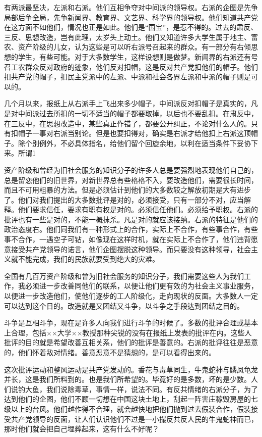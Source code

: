 有两派最坚决，左派和右派。他们互相争夺对中间派的领导权。右派的企图是先争局部后争全局，先争新闻界、教育界、文艺界、科学界的领导权。他们知道共产党在这方面不如他们，情况也正是如此。他们是“国宝”，是惹不得的。过去的肃反、三反、思想改造，岂有此理，太岁头上动土。他们又知道许多大学生属于地主、富农、资产阶级的儿女，认为这些是可以听右派号召起来的群众。有一部分有右倾思想的学生，有些可能。对于大多数学生，这样设想则是做梦。新闻界的右派还有号召工农群众反对政府的迹象，他们反对扣帽，这是反对共产党扣他们的帽子。他们扣共产党的帽子，扣民主党派中的左派、中派和社会各界左派和中派的帽子则是可以的。

几个月以来，报纸上从右派手上飞出来多少帽子，中间派反对扣帽子是真实的，凡是对中间派过去所扣的一切不适当的帽子都要取掉，以后也不要乱扣。在肃反中，在三反中，在思想改造中，某些真正作错了，都要公开纠正，不论对什么人的。只有扣帽子一事对右派当别论。但是也要扣得对，确实是右派才给他扣上右派这顶帽子。除个别例外，不必具体指名，给他们留个回旋余地，以利在适当条件下妥协下来。所谓1%

资产阶级和曾经为旧社会服务的知识分子的许多人总是要强烈地表现他们自己的，总是留恋他们的旧世界，对新世界总有些格格不入，要改造他们，需要很长时间，而且不可用粗暴的方法。但是必须估计到他们的大多数较之解放初期是大有进步了。他们对我们提出的大多数批评是对的，必须接受，只有一部分不对，应当解释。他们要求信任，要求有职有权是对的。必须信任他们。必须给予职权。右派的批评也有一些是对的，不能一概抹杀。凡是对的就应该接纳。右派的特征是他们的政治态度右。他们同我们有一种形式上的合作，实际上不合作，有些事合作，有些事不合作，一遇空子可钻，如像现在这样时机，就在实际上不合作了，他们违背愿意接受共产党领导的诺言，他们企图摆脱这种领导。而只要没有这种领导，社会主义就不能完成，我们的民族就要受到绝大的灾难。

全国有几百万资产阶级和曾为旧社会服务的知识分子，我们需要这些人为我们工作，我必须进一步改善同他们的联系，以便让他们更有效的为社会主义事业服务，以便进一步改造他们，使他们逐步的工人阶级化，走向现状的反面。大多数人一定可以达到这个日的。改造就是又团结又斗争，以斗争之手段达到团结之目的。

斗争是互相斗争，现在是许多人向我们进行斗争的时候了。多数的批评合理或基本上合理，包括××大学××教授那种尖锐的没有在报纸上发表的批评在内。这些人批评的目的就是希望改善互相关系，他们的批评是善意的。右派的批评往往是恶意的，他们怀着敌对情绪。善意恶意不是猜想的，是可以看得出来的。

这次批评运动和整风运动是共产党发动的。香花与毒草同生，牛鬼蛇神与鳞凤龟龙并长，这是我们所料到的。也是我们所希望的。毕竟好的是多数，坏的是少数。人们说钓大鱼，我们说除毒草，事情一样，说法不同。有反共情绪的右派分子，为了达到他们的企图，他们不顾一切想在中国这块土地上，刮起一阵害庄稼毁房屋的七级以上的台风。他们越作得不合理，就会越快地把他们抛到过去假装合作，假装接受共产党领导的反面，让人们认识他们不过是一小撮反共反人民的牛鬼蛇神而已，那时他们就会把自己埋葬起来，这有什么不好呢？

